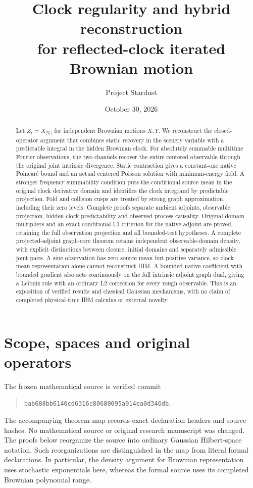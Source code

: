 \documentclass[11pt]{article}
\title{Clock regularity and hybrid reconstruction\\for reflected-clock iterated Brownian motion}
\author{Project Stardust}
\date{October 30, 2026}
\begin{document}
\maketitle
\begin{abstract}
Let $Z_t=X_{|Y_t|}$ for independent Brownian motions $X,Y$.
We reconstruct the closed-operator argument that combines static recovery in
the scenery variable with a predictable integral in the hidden Brownian clock.
For absolutely summable multitime Fourier observations, the two channels
recover the entire centered observable through the original joint intrinsic
divergence. Static contraction gives a constant-one native Poincar\'e
bound and an actual centered Poisson solution with minimum-energy field.
A stronger frequency summability condition puts the conditional
source mean in the original clock derivative domain and identifies the clock
integrand by predictable projection. Fold and collision cusps are treated by
strong graph approximation, including their zero levels. Complete proofs
separate ambient adjoints, observable projection, hidden-clock predictability
and observed-process causality. Original-domain multipliers and an exact
conditional-L1 criterion for the native adjoint are proved, retaining the
full observation projection and all bounded-test hypotheses. A complete
projected-adjoint graph-core theorem retains independent observable-domain
density, with explicit distinctions between closure, initial domains and
separately admissible joint pairs. A sine observation has zero source mean but
positive variance, so clock-mean representation alone cannot reconstruct IBM.
A bounded native coefficient with bounded gradient also acts continuously on the full intrinsic adjoint graph dual, giving a Leibniz rule with an ordinary L2 correction for every rough observable. This is an exposition of verified results and classical Gaussian mechanisms,
with no claim of completed physical-time IBM calculus or external novelty.
\end{abstract}

\section{Scope, spaces and original operators}
The frozen mathematical source is verified commit
\begin{quote}\small\texttt{bab688bb6140cd6316c80680095a914ea0d346db}.\end{quote}
The accompanying theorem map records exact declaration headers and source
hashes. No mathematical source or original research manuscript was changed.
The proofs below reorganize the source into ordinary Gaussian Hilbert-space
notation. Such reorganizations are distinguished in the map from literal
formal declarations. In particular, the density argument for Brownian
representation uses stochastic exponentials here, whereas the formal source
uses its completed Brownian polynomial range.
\end{document}
